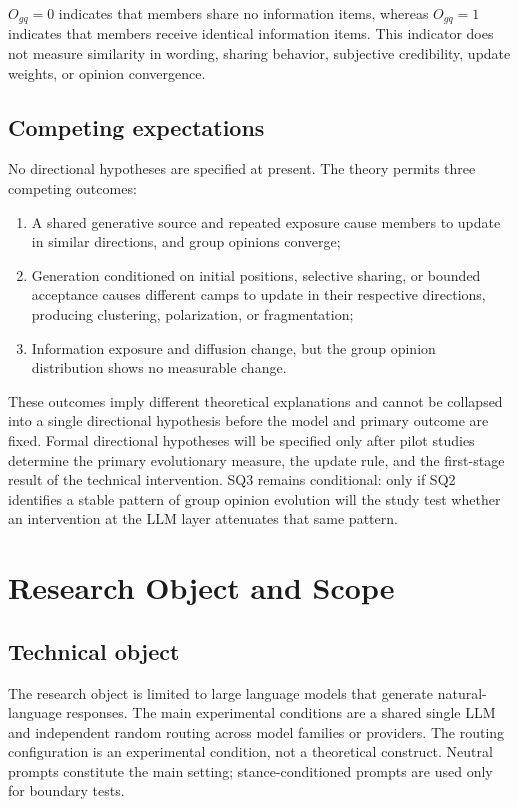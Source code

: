 \documentclass[11pt,a4paper]{article}
\begin{document}
$O_{gq}=0$ indicates that members share no information items, whereas $O_{gq}=1$ indicates that members receive identical information items. This indicator does not measure similarity in wording, sharing behavior, subjective credibility, update weights, or opinion convergence.

\subsection{Competing expectations}

No directional hypotheses are specified at present. The theory permits three competing outcomes:

\begin{enumerate}
\item A shared generative source and repeated exposure cause members to update in similar directions, and group opinions converge;
\item Generation conditioned on initial positions, selective sharing, or bounded acceptance causes different camps to update in their respective directions, producing clustering, polarization, or fragmentation;
\item Information exposure and diffusion change, but the group opinion distribution shows no measurable change.
\end{enumerate}

These outcomes imply different theoretical explanations and cannot be collapsed into a single directional hypothesis before the model and primary outcome are fixed. Formal directional hypotheses will be specified only after pilot studies determine the primary evolutionary measure, the update rule, and the first-stage result of the technical intervention. SQ3 remains conditional: only if SQ2 identifies a stable pattern of group opinion evolution will the study test whether an intervention at the LLM layer attenuates that same pattern.

\section{Research Object and Scope}

\subsection{Technical object}

The research object is limited to large language models that generate natural-language responses. The main experimental conditions are a shared single LLM and independent random routing across model families or providers. The routing configuration is an experimental condition, not a theoretical construct. Neutral prompts constitute the main setting; stance-conditioned prompts are used only for boundary tests.
\end{document}
